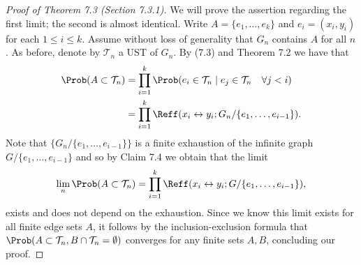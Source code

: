 \begin{proof}[Proof of Theorem 7.3 (Section 7.3.1)]
We will prove the assertion regarding the first limit; the second is almost identical. Write $A=\{e_1,\ldots,e_k\}$ and $e_i=(x_i,y_i)$ for each $1\le i\le k$. Assume without loss of generality that $G_n$ contains $A$ for all $n$. As before, denote by $\mathcal T_n$ a UST of $G_n$. By (7.3) and Theorem 7.2 we have that
\begin{align*}
\Prob(A\subset\mathcal T_n)
&=\prod_{i=1}^k\Prob(e_i\in\mathcal T_n\mid e_j\in\mathcal T_n\quad\forall j<i)\\
&=\prod_{i=1}^k\Reff(x_i\leftrightarrow y_i;G_n/\{e_1,\ldots,e_{i-1}\}).
\end{align*}
Note that $\{G_n/\{e_1,\ldots,e_{i-1}\}\}$ is a finite exhaustion of the infinite graph $G/\{e_1,\ldots,e_{i-1}\}$ and so by Claim 7.4 we obtain that the limit
\[
\lim_n\Prob(A\subset\mathcal T_n)
=\prod_{i=1}^k\Reff(x_i\leftrightarrow y_i;G/\{e_1,\ldots,e_{i-1}\}),
\]
exists and does not depend on the exhaustion.
Since we know this limit exists for all finite edge sets $A$, it follows by the inclusion-exclusion formula that $\Prob(A\subset\mathcal T_n,B\cap\mathcal T_n=\emptyset)$ converges for any finite sets $A,B$, concluding our proof.
\end{proof}
